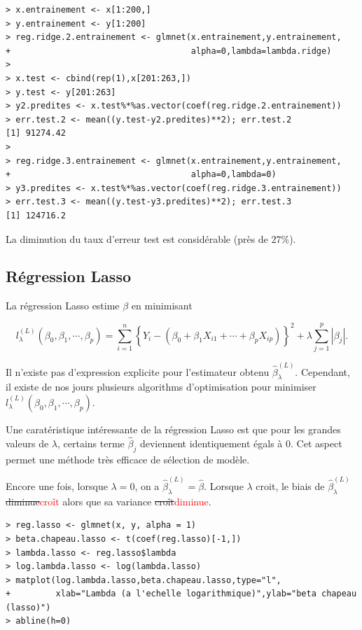 \documentclass[11pt]{article}
\begin{document}
\begin{verbatim}
> x.entrainement <- x[1:200,]
> y.entrainement <- y[1:200]
> reg.ridge.2.entrainement <- glmnet(x.entrainement,y.entrainement,
+                                    alpha=0,lambda=lambda.ridge)
> 
> x.test <- cbind(rep(1),x[201:263,])
> y.test <- y[201:263]
> y2.predites <- x.test%*%as.vector(coef(reg.ridge.2.entrainement))
> err.test.2 <- mean((y.test-y2.predites)**2); err.test.2
[1] 91274.42
> 
> reg.ridge.3.entrainement <- glmnet(x.entrainement,y.entrainement,
+                                    alpha=0,lambda=0)
> y3.predites <- x.test%*%as.vector(coef(reg.ridge.3.entrainement))
> err.test.3 <- mean((y.test-y3.predites)**2); err.test.3
[1] 124716.2
\end{verbatim} 

\noindent La diminution du taux d'erreur test est consid\'erable (pr\`es de $27\%$).

\subsection{R\'egression Lasso}

La r\'egression Lasso estime $\beta$ en minimisant

$$l^{(L)}_\lambda(\beta_0,\beta_1,\cdots,\beta_p) = \sum_{i=1}^n \left\{Y_i - (\beta_0 + \beta_1 X_{i1} + \cdots  + \beta_p X_{ip})\right\}^2 + \lambda \sum_{j=1}^p |\beta_j|.$$

\noindent Il n'existe pas d'expression explicite pour l'estimateur obtenu $\hat\beta^{(L)}_{\lambda}$. Cependant, il existe de nos jours plusieurs algorithms d'optimisation pour minimiser $l^{(L)}_\lambda(\beta_0,\beta_1,\cdots,\beta_p)$.

\noindent Une carat\'eristique int\'eressante de la r\'egression Lasso est que pour les grandes valeurs de $\lambda$, certains terme $\hat\beta_j$ deviennent identiquement \'egals \`a 0. Cet aspect permet une m\'ethode tr\`es efficace de s\'election de mod\`ele. 

\noindent Encore une fois, lorsque $\lambda=0$, on a $\hat\beta^{(L)}_{\lambda}=\hat\beta$. Lorsque $\lambda$ croit, le biais de $\hat\beta^{(L)}_{\lambda}$ \sout{diminue}\textcolor{red}{cro\^it} alors que sa variance \sout{cro\^it}\textcolor{red}{diminue}.

\begin{verbatim}
> reg.lasso <- glmnet(x, y, alpha = 1)
> beta.chapeau.lasso <- t(coef(reg.lasso)[-1,])
> lambda.lasso <- reg.lasso$lambda
> log.lambda.lasso <- log(lambda.lasso)
> matplot(log.lambda.lasso,beta.chapeau.lasso,type="l",
+         xlab="Lambda (a l'echelle logarithmique)",ylab="beta chapeau (lasso)")
> abline(h=0)
\end{verbatim}
\end{document}
